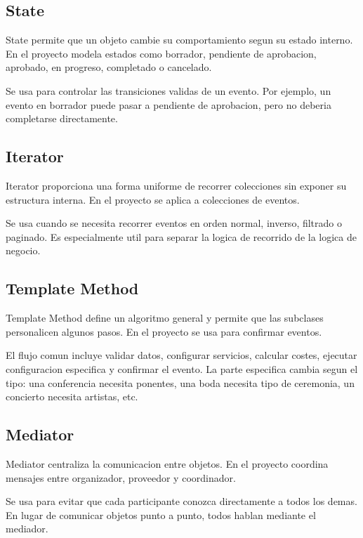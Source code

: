 \documentclass[12pt,a4paper]{article}
\begin{document}
\subsection{State}

State permite que un objeto cambie su comportamiento segun su estado interno. En el proyecto modela estados como borrador, pendiente de aprobacion, aprobado, en progreso, completado o cancelado.

Se usa para controlar las transiciones validas de un evento. Por ejemplo, un evento en borrador puede pasar a pendiente de aprobacion, pero no deberia completarse directamente.

\subsection{Iterator}

Iterator proporciona una forma uniforme de recorrer colecciones sin exponer su estructura interna. En el proyecto se aplica a colecciones de eventos.

Se usa cuando se necesita recorrer eventos en orden normal, inverso, filtrado o paginado. Es especialmente util para separar la logica de recorrido de la logica de negocio.

\subsection{Template Method}

Template Method define un algoritmo general y permite que las subclases personalicen algunos pasos. En el proyecto se usa para confirmar eventos.

El flujo comun incluye validar datos, configurar servicios, calcular costes, ejecutar configuracion especifica y confirmar el evento. La parte especifica cambia segun el tipo: una conferencia necesita ponentes, una boda necesita tipo de ceremonia, un concierto necesita artistas, etc.

\subsection{Mediator}

Mediator centraliza la comunicacion entre objetos. En el proyecto coordina mensajes entre organizador, proveedor y coordinador.

Se usa para evitar que cada participante conozca directamente a todos los demas. En lugar de comunicar objetos punto a punto, todos hablan mediante el mediador.
\end{document}
